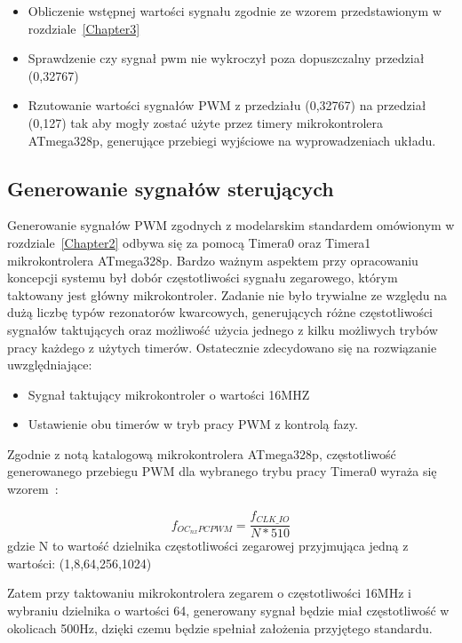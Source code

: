 \begin{itemize}
	\item Obliczenie wstępnej wartości sygnału zgodnie ze wzorem przedstawionym w rozdziale~\ref{Chapter3}
	\item Sprawdzenie czy sygnał pwm nie wykroczył poza dopuszczalny przedział (0,32767)
	\item Rzutowanie wartości sygnałów PWM z przedziału (0,32767) na przedział (0,127) tak aby mogły zostać użyte przez timery mikrokontrolera ATmega328p, generujące przebiegi wyjściowe na wyprowadzeniach układu. 
\end{itemize}


\subsection{Generowanie sygnałów sterujących}

Generowanie sygnałów PWM zgodnych z modelarskim standardem omówionym w rozdziale~\ref{Chapter2} odbywa się za pomocą Timera0 oraz Timera1 mikrokontrolera ATmega328p. Bardzo ważnym aspektem przy opracowaniu koncepcji systemu był dobór częstotliwości sygnału zegarowego, którym taktowany jest główny mikrokontroler. Zadanie nie było trywialne ze względu na dużą liczbę typów rezonatorów kwarcowych, generujących różne częstotliwości sygnałów taktujących oraz możliwość użycia jednego z kilku możliwych trybów pracy każdego z użytych timerów. Ostatecznie zdecydowano się na rozwiązanie uwzględniające:
\begin{itemize}
	\item Sygnał taktujący mikrokontroler o wartości 16MHZ
	\item Ustawienie obu timerów w tryb pracy PWM z kontrolą fazy.
\end{itemize}

Zgodnie z notą katalogową mikrokontrolera ATmega328p, częstotliwość generowanego przebiegu PWM dla wybranego trybu pracy Timera0 wyraża się wzorem~\cite{ds_atmega328p}:

\begin{equation}
	f_{OC_{nx}PCPWM} = \frac{f_{CLK\_IO}}{N * 510}
\end{equation}
gdzie N to wartość dzielnika częstotliwości zegarowej przyjmująca jedną z wartości: (1,8,64,256,1024)
 
Zatem przy taktowaniu mikrokontrolera zegarem o częstotliwości 16MHz i wybraniu dzielnika o wartości 64, generowany sygnał będzie miał częstotliwość w okolicach 500Hz, dzięki czemu będzie spełniał założenia przyjętego standardu. 

